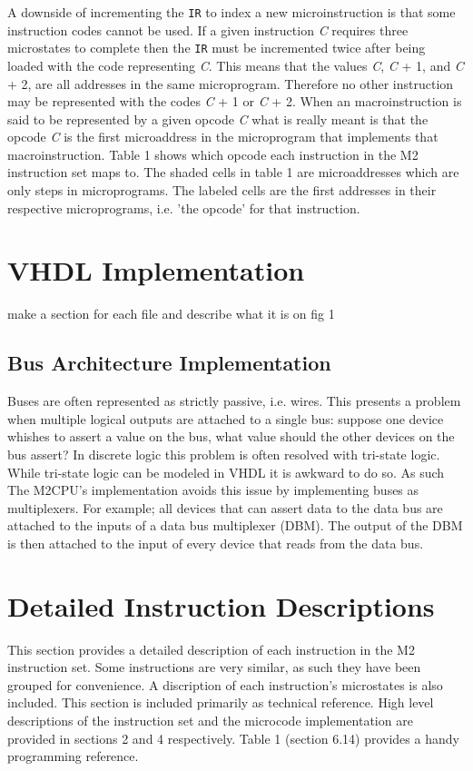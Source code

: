 \documentclass[a4paper,12pt]{article}
\newcommand{\mt}{M2CPU}
\newcommand{\mi}{M2 instruction set}
\newcommand{\IR}{\texttt{IR}}
\begin{document}
A downside of incrementing the \IR{} to index a new microinstruction is that 
some instruction codes cannot be used. If a given instruction \textit{C} 
requires three microstates to complete then the \IR{} must be incremented twice
after being loaded with the code representing \textit{C}. This means that the
values \textit{C}, \textit{C} + 1, and \textit{C} + 2, are all addresses in the
same microprogram. Therefore no other instruction may be represented with the
codes \textit{C} + 1 or \textit{C} + 2. When an macroinstruction is said to be
represented by a given opcode \textit{C} what is really meant is that the 
opcode \textit{C} is the first microaddress in the microprogram that implements
that macroinstruction. Table 1 shows which opcode each instruction in the \mi{}
maps to. The shaded cells in table 1 are microaddresses which are only steps
in microprograms. The labeled cells are the first addresses in their respective
microprograms, i.e. 'the opcode' for that instruction.
\par

\newpage
\section{VHDL Implementation}
make a section for each file and describe what it is on fig 1
\subsection{Bus Architecture Implementation}
Buses are often represented as strictly passive, i.e. wires. This presents a 
problem when multiple logical outputs are attached to a single bus: suppose one
device whishes to assert a value on the bus, what value should the other 
devices on the bus assert? In discrete logic this problem is often resolved with
tri-state logic. While tri-state logic can be modeled in VHDL it is awkward to 
do so. As such The \mt{}'s implementation avoids this issue by implementing 
buses as multiplexers. For example; all devices that can assert data to the data
bus are attached to the inputs of a data bus multiplexer (DBM). The output of 
the DBM is then attached to the input of every device that reads from the data 
bus.
\par

\newpage
\section{Detailed Instruction Descriptions}
This section provides a detailed description of each instruction in the \mi{}.
Some instructions are very similar, as such they have been grouped for 
convenience. A discription of each instruction's microstates is also included.
This section is included primarily as technical reference. High level 
descriptions of the instruction set and the microcode implementation are provided
in sections 2 and 4 respectively. Table 1 (section 6.14) provides a handy 
programming reference.
\par
\end{document}
